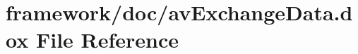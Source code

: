 \hypertarget{av_exchange_data_8dox}{}\section{framework/doc/av\+Exchange\+Data.dox File Reference}
\label{av_exchange_data_8dox}
